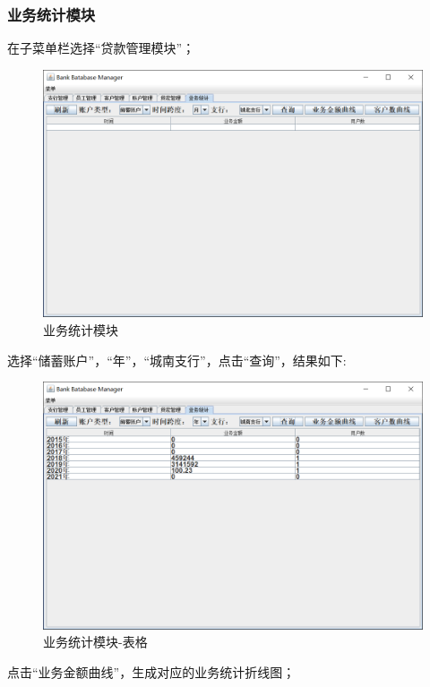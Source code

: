 \documentclass{ctexart}
\begin{document}
\subsubsection{\hei 业务统计模块}
在子菜单栏选择“贷款管理模块”；
\par 
\begin{figure}[H]
    \centering
    \includegraphics[scale=0.2]{tj.png}
    \caption{业务统计模块}
\end{figure}
选择“储蓄账户”，“年”，“城南支行”，点击“查询”，结果如下:
\par 
\begin{figure}[H]
    \centering
    \includegraphics[scale=0.2]{tj1.png}
    \caption{业务统计模块-表格}
\end{figure}
点击“业务金额曲线”，生成对应的业务统计折线图；
\par 
\end{document}
